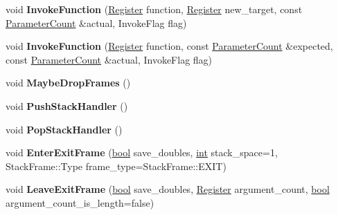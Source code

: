 \begin{DoxyCompactItemize}
\item 
\mbox{\label{classv8_1_1internal_1_1MacroAssembler_a9a69d864f46bb7b56e46d977b24a9fc4}} 
void {\bfseries Invoke\+Function} (\mbox{\hyperlink{classv8_1_1internal_1_1Register}{Register}} function, \mbox{\hyperlink{classv8_1_1internal_1_1Register}{Register}} new\+\_\+target, const \mbox{\hyperlink{classv8_1_1internal_1_1ParameterCount}{Parameter\+Count}} \&actual, Invoke\+Flag flag)
\item 
\mbox{\label{classv8_1_1internal_1_1MacroAssembler_ab075992a89587b70b074351e93c41bb8}} 
void {\bfseries Invoke\+Function} (\mbox{\hyperlink{classv8_1_1internal_1_1Register}{Register}} function, const \mbox{\hyperlink{classv8_1_1internal_1_1ParameterCount}{Parameter\+Count}} \&expected, const \mbox{\hyperlink{classv8_1_1internal_1_1ParameterCount}{Parameter\+Count}} \&actual, Invoke\+Flag flag)
\item 
\mbox{\label{classv8_1_1internal_1_1MacroAssembler_a24c22317b3c647e2829321dade36cf73}} 
void {\bfseries Maybe\+Drop\+Frames} ()
\item 
\mbox{\label{classv8_1_1internal_1_1MacroAssembler_af8ec8c2c3c525fa27b47125b8f2c90fb}} 
void {\bfseries Push\+Stack\+Handler} ()
\item 
\mbox{\label{classv8_1_1internal_1_1MacroAssembler_aaec1b780d52416c78d49b94483afa4f8}} 
void {\bfseries Pop\+Stack\+Handler} ()
\item 
\mbox{\label{classv8_1_1internal_1_1MacroAssembler_a02e533f38645b5ba77bd0549968b59e7}} 
void {\bfseries Enter\+Exit\+Frame} (\mbox{\hyperlink{classbool}{bool}} save\+\_\+doubles, \mbox{\hyperlink{classint}{int}} stack\+\_\+space=1, Stack\+Frame\+::\+Type frame\+\_\+type=Stack\+Frame\+::\+E\+X\+IT)
\item 
\mbox{\label{classv8_1_1internal_1_1MacroAssembler_aebb4e8ea72d795f41fc8abdfea974d2a}} 
void {\bfseries Leave\+Exit\+Frame} (\mbox{\hyperlink{classbool}{bool}} save\+\_\+doubles, \mbox{\hyperlink{classv8_1_1internal_1_1Register}{Register}} argument\+\_\+count, \mbox{\hyperlink{classbool}{bool}} argument\+\_\+count\+\_\+is\+\_\+length=false)

\end{DoxyCompactItemize}
